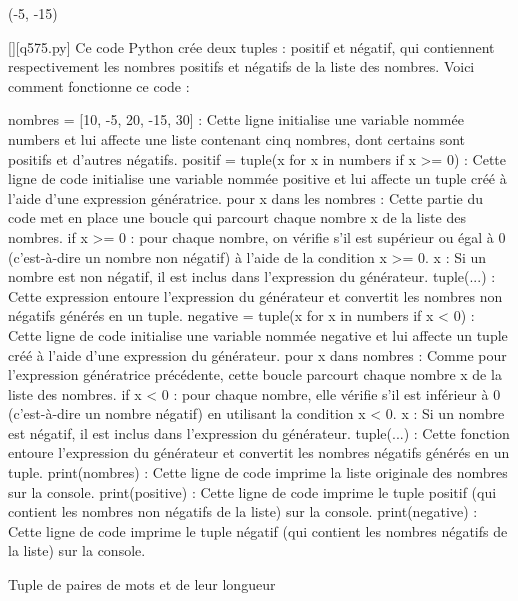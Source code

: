 (-5, -15)
        \par
        \begin{solution}
            \renewcommand{\nomfichier}{q575.py}
            \pythonfile{\chemincode \nomfichier}[][\nomfichier]
            Ce code Python crée deux tuples : positif et négatif, qui contiennent respectivement les nombres positifs et négatifs de la liste des nombres. Voici comment fonctionne ce code :

    nombres = [10, -5, 20, -15, 30] : Cette ligne initialise une variable nommée numbers et lui affecte une liste contenant cinq nombres, dont certains sont positifs et d'autres négatifs.
    positif = tuple(x for x in numbers if x >= 0) : Cette ligne de code initialise une variable nommée positive et lui affecte un tuple créé à l'aide d'une expression génératrice.
        pour x dans les nombres : Cette partie du code met en place une boucle qui parcourt chaque nombre x de la liste des nombres.
        if x >= 0 : pour chaque nombre, on vérifie s'il est supérieur ou égal à 0 (c'est-à-dire un nombre non négatif) à l'aide de la condition x >= 0.
        x : Si un nombre est non négatif, il est inclus dans l'expression du générateur.
        tuple(...) : Cette expression entoure l'expression du générateur et convertit les nombres non négatifs générés en un tuple.
    negative = tuple(x for x in numbers if x < 0) : Cette ligne de code initialise une variable nommée negative et lui affecte un tuple créé à l'aide d'une expression du générateur.
        pour x dans nombres : Comme pour l'expression génératrice précédente, cette boucle parcourt chaque nombre x de la liste des nombres.
        if x < 0 : pour chaque nombre, elle vérifie s'il est inférieur à 0 (c'est-à-dire un nombre négatif) en utilisant la condition x < 0.
        x : Si un nombre est négatif, il est inclus dans l'expression du générateur.
        tuple(...) : Cette fonction entoure l'expression du générateur et convertit les nombres négatifs générés en un tuple.
    print(nombres) : Cette ligne de code imprime la liste originale des nombres sur la console.
    print(positive) : Cette ligne de code imprime le tuple positif (qui contient les nombres non négatifs de la liste) sur la console.
    print(negative) : Cette ligne de code imprime le tuple négatif (qui contient les nombres négatifs de la liste) sur la console.
        \end{solution}
        

        \question
        Tuple de paires de mots et de leur longueur

